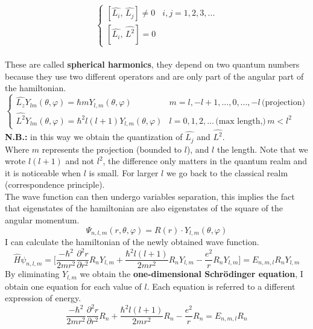 \[
\begin{cases}
[\hat{L_i},\,\hat{L_j}]\neq0 & i,j=1, 2, 3, ...\\
[\hat{L_i},\,\hat{L^2}]=0
\end{cases}
\]
\\
These are called \textbf{spherical harmonics}, they depend on two quantum numbers because they use two different operators and are only part of the angular part of the hamiltonian.\\
\[
\begin{cases}
\hat{L_z}Y_{lm}(\theta,\varphi)=\hbar mY_{l,m}(\theta,\varphi) & m = l, -l+1,..., 0,..., -l \,\text{(projection)}\\
\hat{L^2}Y_{lm}(\theta,\varphi)=\hbar^2 l(l+1)Y_{l,m}(\theta,\varphi) & l = 0, 1, 2, ... \,\text{(max length,)}\, m < l^2
\end{cases}
\]
\textbf{N.B.:} in this way we obtain the quantization of $\hat{L_j}$ and $\hat{L^2}$.\\
Where $m$ represents the projection (bounded to $l$), and $l$ the length. Note that we wrote $l(l+1)$ and not $l^2$, the difference only matters in the quantum realm and it is noticeable when $l$ is small. For larger $l$ we go back to the classical realm (correspondence principle).\\
The wave function can then undergo variables separation, this implies the fact that eigenstates of the hamiltonian are also eigenstates of the square of the angular momentum.
\[
\Psi_{n,l,m}(r,\theta,\varphi)=R(r)\cdot Y_{l,m}(\theta,\varphi)
\]
I can calculate the hamiltonian of the newly obtained wave function.
\[
\hat{H}\psi_{n,l,m}=\bigg[\frac{-\hbar^2}{2mr^2}\frac{\partial^2r}{\partial r^2}R_nY_{l,m}+\frac{\hbar^2l(l+1)}{2mr^2}R_nY_{l,m}-\frac{e^2}{r}R_nY_{l,m}\bigg]=E_{n,m,l}R_nY_{l,m}
\]
By eliminating $Y_{l,m}$ we obtain the \textbf{one-dimensional Schr\"odinger equation}, I obtain one equation for each value of $l$. Each equation is referred to a different expression of energy.
\[
\frac{-\hbar^2}{2mr^2}\frac{\partial^2r}{\partial r^2}R_n+\frac{\hbar^2l(l+1)}{2mr^2}R_n-\frac{e^2}{r}R_n=E_{n,m,l}R_n
\]
\\

